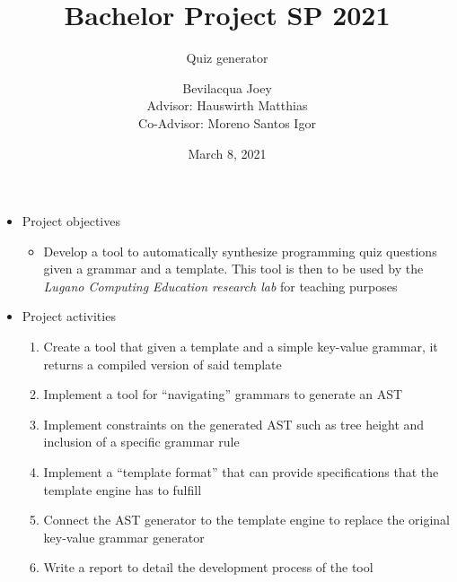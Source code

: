 \documentclass[t,aspectratio=1610]{beamer}
\title{Bachelor Project SP 2021}
\subtitle{Quiz generator}
\author{Bevilacqua Joey\\Advisor: Hauswirth Matthias\\Co-Advisor: Moreno Santos Igor}
\institute{Universit\`a della Svizzera Italiana}
\date{March 8, 2021}
\begin{document}
\begin{frame}
\maketitle
\end{frame}

\begin{frame}
\begin{itemize}
\item \alert{Project objectives}
\begin{itemize}
\item Develop a tool to automatically synthesize programming
      quiz questions given a grammar and a template. This tool
      is then to be used by the 
      \textit{Lugano Computing Education research lab} for
      teaching purposes
\end{itemize}

\medbreak

\item \alert{Project activities}
\begin{enumerate}
\item Create a tool that given a template and a simple
      key-value grammar, it returns a compiled version
      of said template
\item Implement a tool for ``navigating'' grammars to
      generate an AST
\item Implement constraints on the generated AST such
      as tree height and inclusion of a specific grammar rule
\item Implement a ``template format'' that can provide
      specifications that the template engine has to
      fulfill
\item Connect the AST generator to the template engine
      to replace the original key-value grammar generator
\item Write a report to detail the development process of the
      tool
\end{enumerate}
\end{itemize}
\end{frame}
\end{document}

